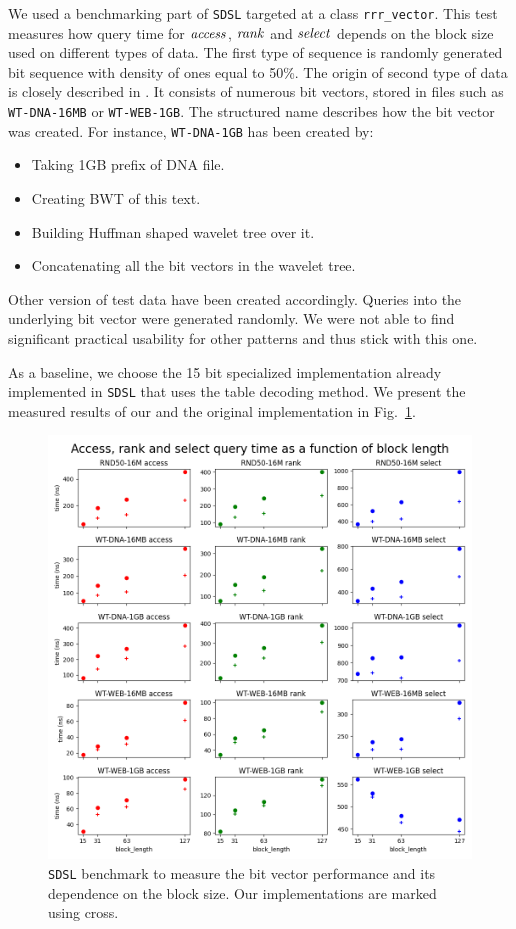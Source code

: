 We used a benchmarking part of \texttt{SDSL} targeted at a class \texttt{rrr\_vector}. This test
measures how query time for $\mathit{access}$, $\mathit{rank}$ and $\mathit{select}$ depends on the block size used on
different types of data. The first type of sequence is randomly generated bit sequence with
density of ones equal to 50\%. The origin of second type of data is closely described in
\cite{gog2014optimized}. It consists of numerous bit vectors, stored in files such as
\texttt{WT-DNA-16MB} or \texttt{WT-WEB-1GB}. The structured name describes how the bit vector
was created. For instance, \texttt{WT-DNA-1GB} has been created by:
\begin{itemize}
	\item Taking 1GB prefix of DNA file.
	\item Creating BWT of this text.
	\item Building Huffman shaped wavelet tree over it.
	\item Concatenating all the bit vectors in the wavelet tree.
\end{itemize}
Other version of test data have been created accordingly. Queries into the underlying bit vector
were generated randomly. We were not able to find significant practical usability for other patterns
and thus stick with this one.

As a baseline, we choose the 15 bit specialized implementation already implemented in \texttt{SDSL}
that uses the table decoding method. We present the measured results of our and the original
implementation in Fig.~\ref{obr:benchmark_sdsl_new_method}.

\begin{figure}
	\centerline{
		\includegraphics[width=\textwidth, height=0.7\textheight]{images/benchmark_sdsl_new_method}
	}
	\caption[TODO]{\texttt{SDSL} benchmark to measure the bit vector performance and its dependence
	on the block size. Our implementations are marked using cross.
	}
	\label{obr:benchmark_sdsl_new_method}
\end{figure}

